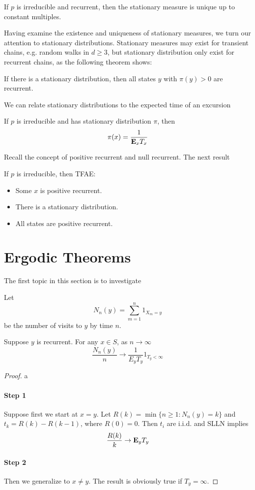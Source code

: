 \begin{theorem}
   If $p$ is irreducible and recurrent, then the stationary measure is unique up to constant multiples. 
\end{theorem}
Having examine the existence and uniqueness of stationary measures, we turn our attention to stationary distributions.
Stationary measures may exist for transient chains, e.g. random walks in $d\geq 3$, but stationary distribution only exist for recurrent chains,
as the following theorem shows:
\begin{theorem}
    If there is a stationary distribution, then all states $y$ with $\pi(y)>0$ are recurrent.
\end{theorem}
We can relate stationary distributions to the expected time of an excursion
\begin{theorem}
    If $p$ is irreducible and has stationary distribution $\pi$, then 
    \[\pi(x)=\frac{1}{\mathbf{E}_x T_x}\]
\end{theorem}
Recall the concept of positive recurrent and null recurrent. The next result 
\begin{theorem}
    If $p$ is irreducible, then TFAE:
    \begin{itemize}
        \item Some $x$ is positive recurrent.
        \item There is a stationary distribution.
        \item All states are positive recurrent.
    \end{itemize}
\end{theorem}

\section{Ergodic Theorems}
The first topic in this section is to investigate 

Let \[N_n(y)=\sum_{m=1}^{n}1_{X_m=y} \] 
be the number of visits to $y$ by time $n$.

\begin{theorem}
    Suppose $y$ is recurrent. For any $x\in S$, as $n\to\infty$ 
    \[ \frac{N_n(y)}{n}\to \frac{1}{E_y T_y}1_{T_y<\infty} \]
\end{theorem}
\begin{proof}
    a
    \paragraph{Step 1} Suppose first we start at $x=y$. Let $R(k)=\min \{n\geq 1:N_n(y)=k \}$ and $t_k=R(k)-R(k-1)$, where $R(0)=0$.
    Then $t_i$ are i.i.d. and SLLN implies \[\frac{R(k)}{k}\to \mathbf{E}_y T_y \] 

    \paragraph{Step 2} Then we generalize to $x\ne y$. The result is obviously true if $T_y=\infty$.
\end{proof}

